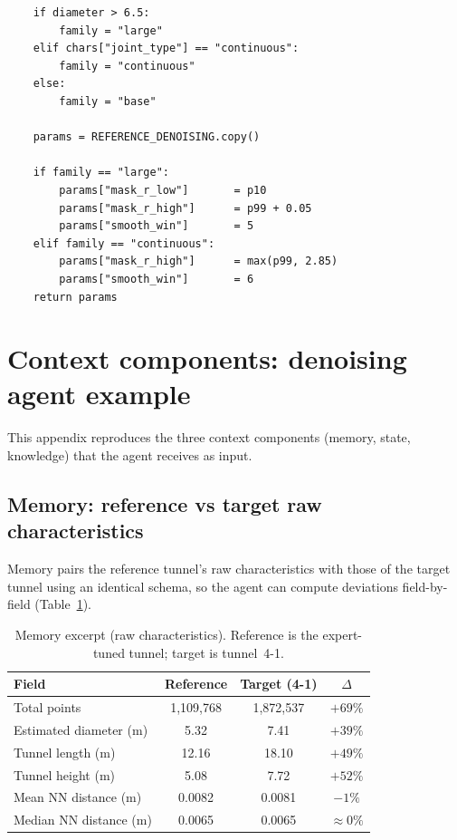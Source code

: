 \documentclass[a4paper,fleqn]{cas-dc}
\begin{document}
{\begin{verbatim}
    if diameter > 6.5:
        family = "large"          
    elif chars["joint_type"] == "continuous":
        family = "continuous"     
    else:
        family = "base"           

    params = REFERENCE_DENOISING.copy()

    if family == "large":
        params["mask_r_low"]       = p10
        params["mask_r_high"]      = p99 + 0.05
        params["smooth_win"]       = 5
    elif family == "continuous":
        params["mask_r_high"]      = max(p99, 2.85)
        params["smooth_win"]       = 6
    return params
\end{verbatim}

\section{Context components: denoising agent example}\label{app:context}

This appendix reproduces the three context components (memory, state, knowledge) that the agent receives as input.

\subsection{Memory: reference vs target raw characteristics}\label{app:context-memory}
Memory pairs the reference tunnel's raw characteristics with those of the target tunnel using an identical schema, so the agent can compute deviations field-by-field (Table~\ref{tab:context-memory}).

\begin{table}[ht]
\caption{Memory excerpt (raw characteristics). Reference is the expert-tuned tunnel; target is tunnel~4-1.}\label{tab:context-memory}
\begin{tabular*}{\tblwidth}{@{} l c c c @{}}
\toprule
Field & Reference & Target (4-1) & $\Delta$ \\
\midrule
Total points & 1{,}109{,}768 & 1{,}872{,}537 & $+69\%$ \\
Estimated diameter (m) & 5.32 & 7.41 & $+39\%$ \\
Tunnel length (m) & 12.16 & 18.10 & $+49\%$ \\
Tunnel height (m) & 5.08 & 7.72 & $+52\%$ \\
Mean NN distance (m) & 0.0082 & 0.0081 & $-1\%$ \\
Median NN distance (m) & 0.0065 & 0.0065 & $\approx 0\%$ \\
\bottomrule
\end{tabular*}
\end{table}

}
\end{document}
